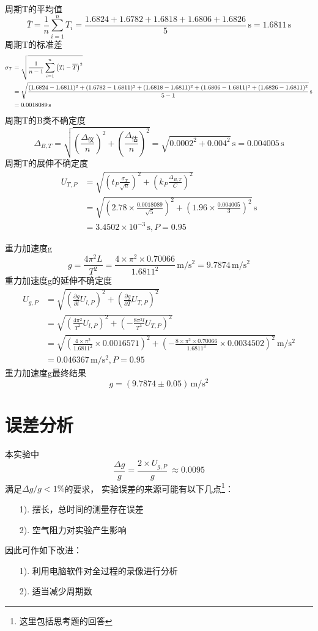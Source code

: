 \documentclass[UTF8]{ctexart}
\begin{document}
\noindent 周期T的平均值
$$
\overline{T}=\frac{1}{n}\sum_{i=1}^{n}T_i=\frac{1.6824+1.6782+1.6818+1.6806+1.6826}{5}\,\mathrm{s}=1.6811\,\mathrm{s}
$$
周期T的标准差
$$
\begin{small}
\begin{aligned}
\sigma_{T}&=\sqrt{\frac{1}{n-1}\sum_{i=1}^n\left(T_i-\overline{T}\right)^2}\\
&=\sqrt{\frac{(1.6824-1.6811)^2+(1.6782-1.6811)^2+(1.6818-1.6811)^2+(1.6806-1.6811)^2+(1.6826-1.6811)^2}{5-1}}\,\mathrm{s}\\
&=0.0018089\,\mathrm{s}
\end{aligned}
\end{small}
$$
周期T的B类不确定度
$$
\Delta_{B,T}=\sqrt{\left(\frac{\Delta_\text{仪}}{n}\right)^2+\left(\frac{\Delta_\text{估}}{n}\right)^2}=\sqrt{0.0002^2+0.004^2}\,\mathrm{s}=0.004005\,\mathrm{s}
$$
周期T的展伸不确定度
$$
\begin{aligned}
U_{T,P}&=\sqrt{\left(t_P\frac{\sigma_{T}}{\sqrt{n}}\right)^2+\left(k_P\frac{\Delta_{B,T}}{C}\right)^2}\\
&=\sqrt{\left(2.78\times\frac{0.0018089}{\sqrt{5}}\right)^2+\left(1.96\times\frac{0.004005}{3}\right)^2}\,\mathrm{s}\\
&=3.4502 \times 10^{-3}\,\mathrm{s},P=0.95
\end{aligned}
$$

\noindent 重力加速度g
$$
g=\frac{4 \pi^{2} L}{T^{2}}=\frac{4\times \pi^2\times 0.70066}{1.6811^2}\,\mathrm{m/s^2}=9.7874\,\mathrm{m/s^2}
$$
重力加速度g的延伸不确定度
$$
\begin{aligned}
U_{g,P}&=\sqrt{\left(\frac{\partial g}{\partial l}U_{l,P}\right)^2+\left(\frac{\partial g}{\partial T}U_{T,P}\right)^2}\\
&=\sqrt{\left(\frac{4 \pi^{2}}{T^{2}}U_{l,P}\right)^2+\left(- \frac{8 \pi^{2} l}{T^{3}}U_{T,P}\right)^2}\\
&=\sqrt{\left(\frac{4\times \pi^2}{1.6811^2}\times 0.0016571\right)^2+\left(-\frac{8\times \pi^2\times 0.70066}{1.6811^3}\times 0.0034502\right)^2}\,\mathrm{m/s^2}\\
&=0.046367\,\mathrm{m/s^2},P=0.95
\end{aligned}
$$
重力加速度g最终结果
$$
g=\left(9.7874 \pm 0.05\right)\,\mathrm{m/s^2}
$$
\clearpage
\section{误差分析}
\noindent 本实验中
$$
\frac{\Delta g}{g}=\frac{2\times U_{g,P}}{g}\ \approx 0.0095
$$
满足$\Delta g/g<1\%$的要求，
实验误差的来源可能有以下几点\footnote{这里包括思考题的回答}：
\begin{enumerate}
    \item [1).] 摆长，总时间的测量存在误差
    \item [2).] 空气阻力对实验产生影响
\end{enumerate}
因此可作如下改进：
\begin{enumerate}
    \item [1).] 利用电脑软件对全过程的录像进行分析
    \item [2).] 适当减少周期数
\end{enumerate}
\end{document}
